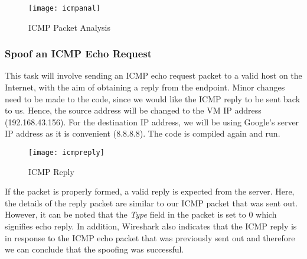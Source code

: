 \documentclass[a4paper,12pt]{article}
\begin{document}
\begin{figure}[H]
\centering
\texttt{[image: icmpanal]}
\caption{ICMP Packet Analysis}
\label{fig:icmpanal}
\end{figure}

\subsubsection{Spoof an ICMP Echo Request}
This task will involve sending an ICMP echo request packet to a valid host on the Internet, with the aim of obtaining a reply from the endpoint. Minor changes need to be made to the code, since we would like the ICMP reply to be sent back to us. Hence, the source address will be changed to the VM IP address (192.168.43.156). For the destination IP address, we will be using Google's server IP address as it is convenient (8.8.8.8). The code is compiled again and run.

\begin{figure}[H]
\centering
\texttt{[image: icmpreply]}
\caption{ICMP Reply}
\label{fig:icmpreply}
\end{figure}

\noindent If the packet is properly formed, a valid reply is expected from the server. Here, the details of the reply packet are similar to our ICMP packet that was sent out. However, it can be noted that the \textit{Type} field in the packet is set to 0 which signifies echo reply. In addition, Wireshark also indicates that the ICMP reply is in response to the ICMP echo packet that was previously sent out and therefore we can conclude that the spoofing was successful.
\end{document}

